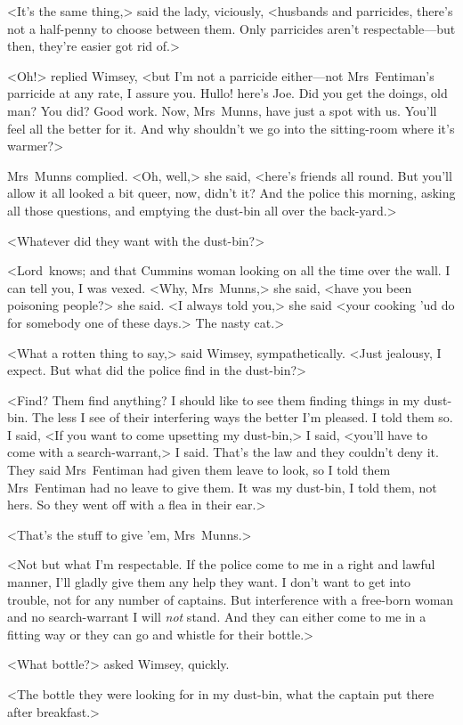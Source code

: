 <It's the same thing,> said the lady, viciously, <husbands and parricides, there's not a half-penny to choose between them. Only parricides aren't respectable—but then, they're easier got rid of.>

<Oh!> replied Wimsey, <but I'm not a parricide either—not Mrs~Fentiman's parricide at any rate, I assure you. Hullo! here's Joe. Did you get the doings, old man? You did? Good work. Now, Mrs~Munns, have just a spot with us. You'll feel all the better for it. And why shouldn't we go into the sitting-room where it's warmer?>

Mrs~Munns complied. <Oh, well,> she said, <here's friends all round. But you'll allow it all looked a bit queer, now, didn't it? And the police this morning, asking all those questions, and emptying the dust-bin all over the back-yard.>

<Whatever did they want with the dust-bin?>

<Lord~knows; and that Cummins woman looking on all the time over the wall. I can tell you, I was vexed. <Why, Mrs~Munns,> she said, <have you been poisoning people?> she said. <I always told you,> she said <your cooking 'ud do for somebody one of these days.> The nasty cat.>

<What a rotten thing to say,> said Wimsey, sympathetically. <Just jealousy, I expect. But what did the police find in the dust-bin?>

<Find? Them find anything? I should like to see them finding things in my dust-bin. The less I see of their interfering ways the better I'm pleased. I told them so. I said, <If you want to come upsetting my dust-bin,> I said, <you'll have to come with a search-warrant,> I said. That's the law and they couldn't deny it. They said Mrs~Fentiman had given them leave to look, so I told them Mrs~Fentiman had no leave to give them. It was my dust-bin, I told them, not hers. So they went off with a flea in their ear.>

<That's the stuff to give 'em, Mrs~Munns.>

<Not but what I'm respectable. If the police come to me in a right and lawful manner, I'll gladly give them any help they want. I don't want to get into trouble, not for any number of captains. But interference with a free-born woman and no search-warrant I will \emph{not} stand. And they can either come to me in a fitting way or they can go and whistle for their bottle.>

<What bottle?> asked Wimsey, quickly.

<The bottle they were looking for in my dust-bin, what the captain put there after breakfast.>

